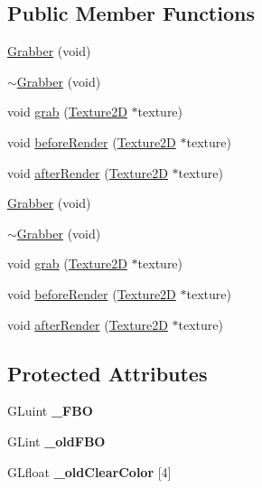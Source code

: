 \subsection*{Public Member Functions}
\begin{DoxyCompactItemize}
\item 
\hyperlink{classGrabber_a5bc904ccb8d712452e793f9339a0616f}{Grabber} (void)
\item 
\hyperlink{classGrabber_af101dcd8d526aa14315c3f9bbd580b5a}{$\sim$\+Grabber} (void)
\item 
void \hyperlink{classGrabber_abca4258ce3080009f5ed06d30ea913f7}{grab} (\hyperlink{classTexture2D}{Texture2D} $\ast$texture)
\item 
void \hyperlink{classGrabber_ab4eaa7f3482cf2a1e845da657ea875bb}{before\+Render} (\hyperlink{classTexture2D}{Texture2D} $\ast$texture)
\item 
void \hyperlink{classGrabber_a6d97a8b92dce89b0cf96ecffdb704fce}{after\+Render} (\hyperlink{classTexture2D}{Texture2D} $\ast$texture)
\item 
\hyperlink{classGrabber_afbe4643baa9a73654b6eeaa8195b177d}{Grabber} (void)
\item 
\hyperlink{classGrabber_af101dcd8d526aa14315c3f9bbd580b5a}{$\sim$\+Grabber} (void)
\item 
void \hyperlink{classGrabber_abca4258ce3080009f5ed06d30ea913f7}{grab} (\hyperlink{classTexture2D}{Texture2D} $\ast$texture)
\item 
void \hyperlink{classGrabber_ab4eaa7f3482cf2a1e845da657ea875bb}{before\+Render} (\hyperlink{classTexture2D}{Texture2D} $\ast$texture)
\item 
void \hyperlink{classGrabber_a6d97a8b92dce89b0cf96ecffdb704fce}{after\+Render} (\hyperlink{classTexture2D}{Texture2D} $\ast$texture)
\end{DoxyCompactItemize}
\subsection*{Protected Attributes}
\begin{DoxyCompactItemize}
\item 
\mbox{\label{classGrabber_af916734b710e4475d53b4f4bc7467332}} 
G\+Luint {\bfseries \+\_\+\+F\+BO}
\item 
\mbox{\label{classGrabber_a2f40eef2664dcf29b4456972d1c0cd23}} 
G\+Lint {\bfseries \+\_\+old\+F\+BO}
\item 
\mbox{\label{classGrabber_a55b4abcd84b5302c7bb7a31e303e8b1e}} 
G\+Lfloat {\bfseries \+\_\+old\+Clear\+Color} \mbox{[}4\mbox{]}
\end{DoxyCompactItemize}
